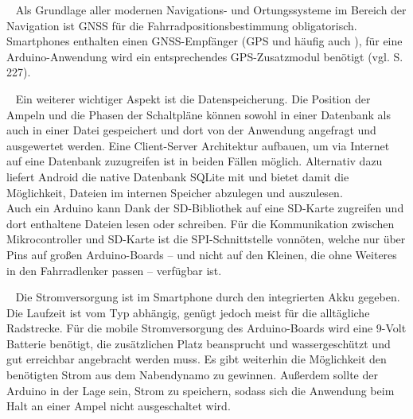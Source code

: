 \begin{description}[leftmargin=0.7cm,style=nextline]
  \item[\gls{GNSS}] ~ Als Grundlage aller modernen Navigations- und Ortungssysteme im Bereich der Navigation ist \gls{GNSS} für die Fahrradpositionsbestimmung obligatorisch. \glspl{Smartphone} enthalten einen \gls{GNSS}-Empfänger (\gls{GPS} und häufig auch ), für eine \gls{Arduino}-Anwendung wird ein entsprechendes \gls{GPS}-Zusatzmodul benötigt (vgl. \cite{arduino} S. 227).\\
 \item[Datenspeicherung] ~ Ein weiterer wichtiger Aspekt ist die Datenspeicherung. Die Position der Ampeln und die Phasen der Schaltpläne können sowohl in einer Datenbank als auch in einer Datei gespeichert und dort von der Anwendung angefragt und ausgewertet werden. Eine Client-Server Architektur aufbauen, um via Internet auf eine Datenbank zuzugreifen ist in beiden Fällen möglich. Alternativ dazu liefert Android die native Datenbank SQLite mit und bietet damit die Möglichkeit, Dateien im internen Speicher abzulegen und auszulesen.\\ 
Auch ein \gls{Arduino} kann Dank der SD-Bibliothek auf eine SD-Karte zugreifen und dort enthaltene Dateien lesen oder schreiben. Für die Kommunikation zwischen Mikrocontroller und SD-Karte ist die SPI-Schnittstelle vonnöten, welche nur über Pins auf großen \gls{Arduino}-Boards -- und nicht auf den Kleinen, die ohne Weiteres in den Fahrradlenker passen -- verfügbar ist.\cite{arduino_sd}\\
  \item[Stromversorgung] ~ Die Stromversorgung ist im \gls{Smartphone} durch den integrierten Akku gegeben. Die Laufzeit ist vom Typ abhängig, genügt jedoch meist für die alltägliche Radstrecke. Für die mobile Stromversorgung des \gls{Arduino}-Boards wird eine 9-Volt Batterie benötigt, die zusätzlichen Platz beansprucht und wassergeschützt und gut erreichbar angebracht werden muss. Es gibt weiterhin die Möglichkeit den benötigten Strom aus dem Nabendynamo zu gewinnen. Außerdem sollte der \gls{Arduino} in der Lage sein, Strom zu speichern, sodass sich die Anwendung beim Halt an einer Ampel nicht ausgeschaltet wird.\\

\end{description}

